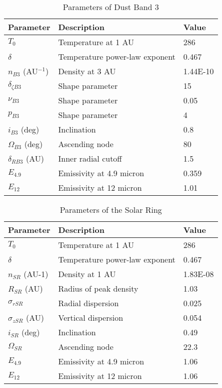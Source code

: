 \documentclass[a4paper,10pt]{article}
\begin{document}
\begin{table}[htbp]
\caption{Parameters of Dust Band 3}
\begin{tabular}{lll}
\hline
\textbf{Parameter} & \textbf{Description}           & \textbf{Value} \\ \hline
$T_0$                 & Temperature at 1 AU            & 286            \\
$\delta$              & Temperature power-law exponent & 0.467          \\
$n_{B3}$ (AU$^{-1}$)         & Density at 3 AU                & 1.44E-10       \\
$\delta_{\zeta B3}$      & Shape parameter                & 15             \\
$\nu_{B3}$              & Shape parameter                & 0.05           \\
$p_{B3}$               & Shape parameter                & 4              \\
$i_{B3}$ (deg)         & Inclination                    & 0.8            \\
$\Omega_{B3}$ (deg)     & Ascending node                 & 80             \\
$\delta_{R B3}$ (AU)    & Inner radial cutoff            & 1.5            \\
$E_{4.9}$               & Emissivity at 4.9 micron       & 0.359          \\
$E_{12}$                & Emissivity at 12 micron        & 1.01           \\ \hline
\end{tabular}
\end{table}

\begin{table}[htbp]
\caption{Parameters of the Solar Ring}
\begin{tabular}{lll}
\hline
\textbf{Parameter} & \textbf{Description}           & \textbf{Value} \\ \hline
$T_0$                 & Temperature at 1 AU            & 286            \\
$\delta$              & Temperature power-law exponent & 0.467          \\
$n_{SR}$ (AU-1)         & Density at 1 AU                & 1.83E-08       \\
$R_{SR}$ (AU)           & Radius of peak density         & 1.03           \\
$\sigma_{rSR}$          & Radial dispersion              & 0.025          \\
$\sigma_{zSR}$ (AU)     & Vertical dispersion            & 0.054          \\
$i_{SR}$ (deg)          & Inclination                    & 0.49           \\
$\Omega_{SR}$           & Ascending node                 & 22.3           \\
$E_{4.9}$               & Emissivity at 4.9 micron       & 1.06           \\
$E_{12}$                & Emissivity at 12 micron        & 1.06           \\ \hline
\end{tabular}
\end{table}
\end{document}
